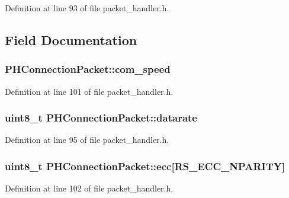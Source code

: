 \-Definition at line 93 of file packet\-\_\-handler.\-h.



\subsection{\-Field \-Documentation}
\hypertarget{struct_p_h_connection_packet_aba21090aa4d393dc1d6e85406efa1c4b}{
\subsubsection[{com\-\_\-speed}]{ {\bf \-P\-H\-Connection\-Packet\-::com\-\_\-speed}}}\label{struct_p_h_connection_packet_aba21090aa4d393dc1d6e85406efa1c4b}


\-Definition at line 101 of file packet\-\_\-handler.\-h.

\hypertarget{struct_p_h_connection_packet_ac0efb46843892dc7b42a503eeea6d58c}{
\subsubsection[{datarate}]{\setlength{\rightskip}{0pt plus 5cm}uint8\-\_\-t {\bf \-P\-H\-Connection\-Packet\-::datarate}}}\label{struct_p_h_connection_packet_ac0efb46843892dc7b42a503eeea6d58c}


\-Definition at line 95 of file packet\-\_\-handler.\-h.

\hypertarget{struct_p_h_connection_packet_a047b7d5ea9d5699d06966d96ef4ccfba}{
\subsubsection[{ecc}]{\setlength{\rightskip}{0pt plus 5cm}uint8\-\_\-t {\bf \-P\-H\-Connection\-Packet\-::ecc}\mbox{[}\-R\-S\-\_\-\-E\-C\-C\-\_\-\-N\-P\-A\-R\-I\-T\-Y\mbox{]}}}\label{struct_p_h_connection_packet_a047b7d5ea9d5699d06966d96ef4ccfba}


\-Definition at line 102 of file packet\-\_\-handler.\-h.

